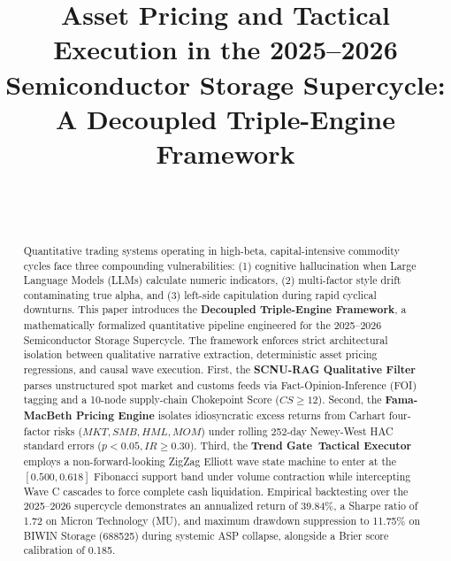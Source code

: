 \documentclass[journal,10pt,twocolumn]{IEEEtran}
\begin{document}
\title{Asset Pricing and Tactical Execution in the 2025--2026 Semiconductor Storage Supercycle: A Decoupled Triple-Engine Framework}

\author{
     \\
     \\
}

\maketitle

\begin{abstract}
Quantitative trading systems operating in high-beta, capital-intensive commodity cycles face three compounding vulnerabilities: (1) cognitive hallucination when Large Language Models (LLMs) calculate numeric indicators, (2) multi-factor style drift contaminating true alpha, and (3) left-side capitulation during rapid cyclical downturns. This paper introduces the \textbf{Decoupled Triple-Engine Framework}, a mathematically formalized quantitative pipeline engineered for the 2025--2026 Semiconductor Storage Supercycle. The framework enforces strict architectural isolation between qualitative narrative extraction, deterministic asset pricing regressions, and causal wave execution. First, the \textbf{SCNU-RAG Qualitative Filter} parses unstructured spot market and customs feeds via Fact-Opinion-Inference (FOI) tagging and a 10-node supply-chain Chokepoint Score ($CS \ge 12$). Second, the \textbf{Fama-MacBeth Pricing Engine} isolates idiosyncratic excess returns from Carhart four-factor risks ($MKT, SMB, HML, MOM$) under rolling 252-day Newey-West HAC standard errors ($p < 0.05, IR \ge 0.30$). Third, the \textbf{Trend Gate\texttrademark\ Tactical Executor} employs a non-forward-looking ZigZag Elliott wave state machine to enter at the $[0.500, 0.618]$ Fibonacci support band under volume contraction while intercepting Wave C cascades to force complete cash liquidation. Empirical backtesting over the 2025--2026 supercycle demonstrates an annualized return of 39.84\%, a Sharpe ratio of 1.72 on Micron Technology (MU), and maximum drawdown suppression to 11.75\% on BIWIN Storage (688525) during systemic ASP collapse, alongside a Brier score calibration of 0.185.
\end{abstract}
\end{document}
